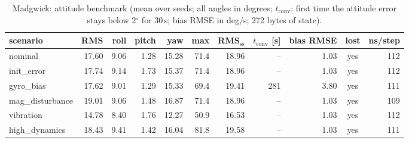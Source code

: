 \begin{table}[H]\centering\footnotesize\setlength{\tabcolsep}{3.5pt}\caption{Madgwick: attitude benchmark (mean over seeds; all angles in degrees; $t_\mathrm{conv}$: first time the attitude error stays below 2$^\circ$ for 30\,s; bias RMSE in deg/s; 272 bytes of state).}\label{tab:imu_Madgwick}
\begin{tabular}{lrrrrrrrrcr}\toprule scenario & RMS & roll & pitch & yaw & max & RMS$_\mathrm{ss}$ & $t_\mathrm{conv}$ [s] & bias RMSE & lost & ns/step \\ \midrule
nominal & 17.60 & 9.06 & 1.28 & 15.28 & 71.4 & 18.96 & -- & 1.03 & yes & 112 \\
init\_error & 17.74 & 9.14 & 1.73 & 15.37 & 71.4 & 18.96 & -- & 1.03 & yes & 112 \\
gyro\_bias & 17.62 & 9.01 & 1.29 & 15.33 & 69.4 & 19.41 & 281 & 3.80 & yes & 111 \\
mag\_disturbance & 19.01 & 9.06 & 1.48 & 16.87 & 71.4 & 18.96 & -- & 1.03 & yes & 109 \\
vibration & 14.78 & 8.40 & 1.76 & 12.27 & 50.9 & 16.53 & -- & 1.03 & yes & 112 \\
high\_dynamics & 18.43 & 9.41 & 1.42 & 16.04 & 81.8 & 19.58 & -- & 1.03 & yes & 111 \\
\bottomrule\end{tabular}\end{table}
